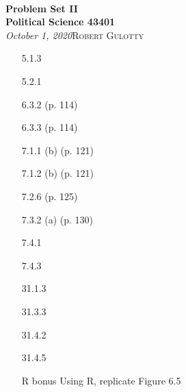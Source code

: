 \documentclass[12pt]{article}
\begin{document}
{\noindent\Huge\bf  \\[0.5\baselineskip] {\selectfont  Problem Set II}         }\\[2\baselineskip] %
{ {\bf {}\selectfont Political Science 43401}\\ {\textit{\selectfont     October 1, 2020}}}\hfill   {\large \textsc{Robert Gulotty}} %
\\[1.4\baselineskip] 





\begin{enumerate}

\item[5.1.3] 
\item[5.2.1]
\item[6.3.2] (p. 114)
\item[ 6.3.3] (p. 114)
\item[ 7.1.1] (b) (p. 121)
\item[7.1.2] (b) (p. 121)
\item[7.2.6] (p. 125)
\item[ 7.3.2] (a) (p. 130)
\item[7.4.1]
\item[7.4.3]
\item[31.1.3]
\item[31.3.3]
\item[31.4.2 ]
\item[31.4.5 ] 
\item[R bonus] Using R, replicate Figure 6.5
\end{enumerate}
\end{document}
